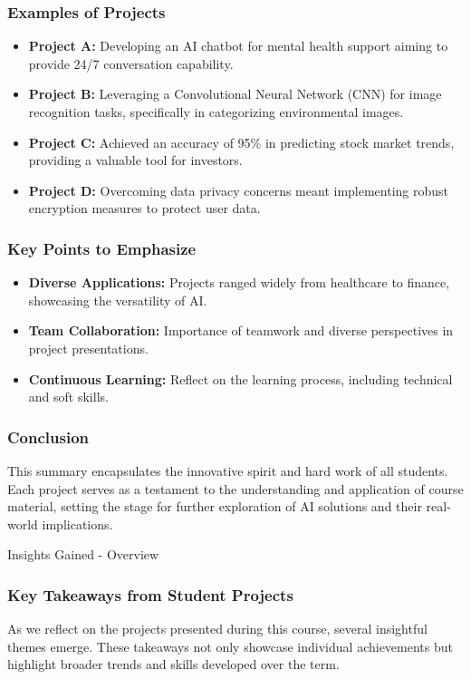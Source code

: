\documentclass[aspectratio=169]{beamer}
\begin{document}
\begin{frame}[fragile]
    \frametitle{Examples of Projects}
    \begin{itemize}
        \item \textbf{Project A:} Developing an AI chatbot for mental health support aiming to provide 24/7 conversation capability.
        \item \textbf{Project B:} Leveraging a Convolutional Neural Network (CNN) for image recognition tasks, specifically in categorizing environmental images.
        \item \textbf{Project C:} Achieved an accuracy of 95\% in predicting stock market trends, providing a valuable tool for investors.
        \item \textbf{Project D:} Overcoming data privacy concerns meant implementing robust encryption measures to protect user data.
    \end{itemize}
\end{frame}

\begin{frame}[fragile]
    \frametitle{Key Points to Emphasize}
    \begin{itemize}
        \item \textbf{Diverse Applications:} Projects ranged widely from healthcare to finance, showcasing the versatility of AI.
        \item \textbf{Team Collaboration:} Importance of teamwork and diverse perspectives in project presentations.
        \item \textbf{Continuous Learning:} Reflect on the learning process, including technical and soft skills.
    \end{itemize}
\end{frame}

\begin{frame}[fragile]
    \frametitle{Conclusion}
    This summary encapsulates the innovative spirit and hard work of all students. Each project serves as a testament to the understanding and application of course material, setting the stage for further exploration of AI solutions and their real-world implications.
\end{frame}

\begin{frame}[fragile]{Insights Gained - Overview}
    \frametitle{Key Takeaways from Student Projects}
    As we reflect on the projects presented during this course, several insightful themes emerge. These takeaways not only showcase individual achievements but highlight broader trends and skills developed over the term.
\end{frame}
\end{document}
